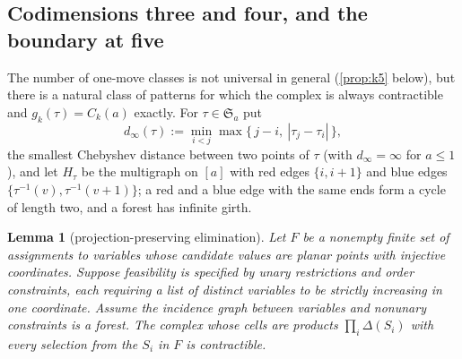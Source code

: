 \documentclass[11pt,reqno]{amsart}
\theoremstyle{plain}
\newtheorem{lemma}[lemma]{Lemma}
\theoremstyle{definition}
\theoremstyle{remark}
\newcommand{\Sym}{\mathfrak{S}}
\begin{document}
\subsection{Codimensions three and four, and the boundary at five}
The number of one-move classes is not universal in general (\cref{prop:k5} below), but there is a natural class of patterns for which the complex is always contractible and $g_k(\tau)=C_k(a)$ exactly. For $\tau\in\Sym_a$ put
\begin{equation}\label{eq:dinf}
d_\infty(\tau):=\min_{i<j}\max\{\,j-i,\ |\tau_j-\tau_i|\,\},
\end{equation}
the smallest Chebyshev distance between two points of $\tau$ (with $d_\infty=\infty$ for $a\le1$), and let $H_\tau$ be the multigraph on $[a]$ with red edges $\{i,i+1\}$ and blue edges $\{\tau^{-1}(v),\tau^{-1}(v+1)\}$; a red and a blue edge with the same ends form a cycle of length two, and a forest has infinite girth.

\begin{lemma}[projection-preserving elimination]\label{lem:elimination}
Let $F$ be a nonempty finite set of assignments to variables whose
candidate values are planar points with injective coordinates. Suppose
feasibility is specified by unary restrictions and order constraints,
each requiring a list of distinct variables to be strictly increasing in
one coordinate. Assume the incidence graph between
variables and nonunary constraints is a forest.
The complex whose cells are products $\prod_i\Delta(S_i)$ with every
selection from the $S_i$ in $F$ is contractible.
\end{lemma}
\end{document}
